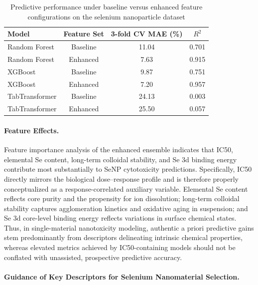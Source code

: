 \documentclass[letterpaper]{article}
\begin{document}
\begin{table}[htbp]
  \centering
  \caption{Predictive performance under baseline versus enhanced feature configurations on the selenium nanoparticle dataset}
  \label{tab:senp_main_results}
  \begin{tabular}{lccc}
    \hline
    Model & Feature Set & 3-fold CV MAE (\%) & $R^2$ \\
    \hline
    Random Forest & Baseline & 11.04 & 0.701 \\
    Random Forest & Enhanced & 7.63 & 0.915 \\
    XGBoost & Baseline & 9.87 & 0.751 \\
    XGBoost & Enhanced & 7.20 & 0.957 \\
    TabTransformer & Baseline & 24.13 & 0.003 \\
    TabTransformer & Enhanced & 25.50 & 0.057 \\
    \hline
  \end{tabular}
\end{table}

\paragraph{Feature Effects.}
Feature importance analysis of the enhanced ensemble indicates that IC50, elemental Se content, long-term colloidal stability, and Se 3d binding energy contribute most substantially to SeNP cytotoxicity predictions. Specifically, IC50 directly mirrors the biological dose--response profile and is therefore properly conceptualized as a response-correlated auxiliary variable. Elemental Se content reflects core purity and the propensity for ion dissolution; long-term colloidal stability captures agglomeration kinetics and oxidative aging in suspension; and Se 3d core-level binding energy reflects variations in surface chemical states. Thus, in single-material nanotoxicity modeling, authentic a priori predictive gains stem predominantly from descriptors delineating intrinsic chemical properties, whereas elevated metrics achieved by IC50-containing models should not be conflated with unassisted, prospective predictive accuracy.

\paragraph{Guidance of Key Descriptors for Selenium Nanomaterial Selection.}
\end{document}
